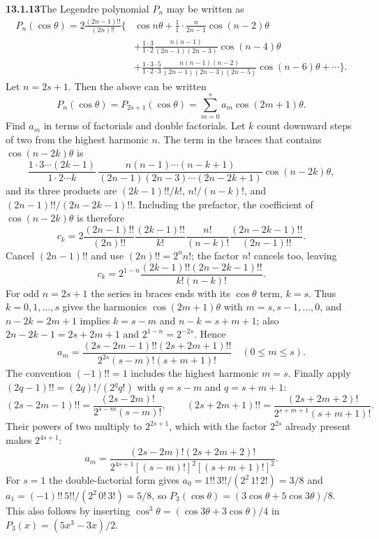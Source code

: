 \par\bigskip
\noindent\textbf{13.1.13}\quad The Legendre polynomial $P_{n}$ may be written
as
\begin{align*}
P_{n}(\cos\theta)=2\frac{(2n-1)!!}{(2n)!!}\Bigg\{&\cos n\theta
+\frac{1}{1}\cdot\frac{n}{2n-1}\cos(n-2)\theta\\
&+\frac{1\cdot3}{1\cdot2}\frac{n(n-1)}{(2n-1)(2n-3)}\cos(n-4)\theta\\
&+\frac{1\cdot3\cdot5}{1\cdot2\cdot3}
\frac{n(n-1)(n-2)}{(2n-1)(2n-3)(2n-5)}\cos(n-6)\theta+\cdots\Bigg\}.
\end{align*}
Let $n=2s+1$. Then the above can be written
\[
P_{n}(\cos\theta)=P_{2s+1}(\cos\theta)=\sum_{m=0}^{s}a_{m}\cos(2m+1)\theta.
\]
Find $a_{m}$ in terms of factorials and double factorials.
\solution
Let $k$ count downward steps of two from the highest harmonic $n$.
The term in the braces that contains $\cos(n-2k)\theta$ is
\[
\frac{1\cdot3\cdots(2k-1)}{1\cdot2\cdots k}\,
\frac{n(n-1)\cdots(n-k+1)}{(2n-1)(2n-3)\cdots(2n-2k+1)}
\cos(n-2k)\theta,
\]
and its three products are $(2k-1)!!/k!$, $n!/(n-k)!$, and
$(2n-1)!!/(2n-2k-1)!!$.  Including the prefactor, the coefficient of
$\cos(n-2k)\theta$ is therefore
\[
c_k=2\frac{(2n-1)!!}{(2n)!!}
 \frac{(2k-1)!!}{k!}
 \frac{n!}{(n-k)!}
 \frac{(2n-2k-1)!!}{(2n-1)!!}.
\]
Cancel $(2n-1)!!$ and use $(2n)!!=2^n n!$; the factor $n!$ cancels
too, leaving
\[
c_k=2^{1-n}\frac{(2k-1)!!(2n-2k-1)!!}{k!(n-k)!}.
\]
For odd $n=2s+1$ the series in braces ends with its $\cos\theta$
term, $k=s$.    Thus $k=0,1,\ldots,s$ gives the harmonics
$\cos(2m+1)\theta$ with $m=s,s-1,\ldots,0$, and $n-2k=2m+1$ implies
$k=s-m$ and $n-k=s+m+1$; also $2n-2k-1=2s+2m+1$ and
$2^{1-n}=2^{-2s}$.  Hence
\[
\boxed{a_m=
\frac{(2s-2m-1)!!(2s+2m+1)!!}
{2^{2s}(s-m)!(s+m+1)!}\quad(0\le m\le s)}.
\]
The convention $(-1)!!=1$ includes the highest harmonic $m=s$.
Finally apply $(2q-1)!!=(2q)!/(2^q q!)$ with $q=s-m$ and
$q=s+m+1$:
\[
(2s-2m-1)!!=\frac{(2s-2m)!}{2^{s-m}(s-m)!},\qquad
(2s+2m+1)!!=\frac{(2s+2m+2)!}{2^{s+m+1}(s+m+1)!}.
\]
Their powers of two multiply to $2^{2s+1}$, which with the factor
$2^{2s}$ already present makes $2^{4s+1}$:
\[
\boxed{a_m=
\frac{(2s-2m)!(2s+2m+2)!}
{2^{4s+1}[(s-m)!]^2[(s+m+1)!]^2}}.
\]
For $s=1$ the double-factorial form gives
$a_0=1!!\,3!!/(2^2\,1!\,2!)=3/8$ and $a_1=(-1)!!\,5!!/(2^2\,0!\,3!)=5/8$,
so $P_3(\cos\theta)=(3\cos\theta+5\cos3\theta)/8$.  This also follows
by inserting $\cos^3\theta=(\cos3\theta+3\cos\theta)/4$ in
$P_3(x)=(5x^3-3x)/2$.


